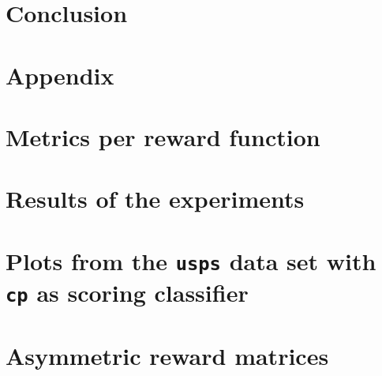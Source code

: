 \documentclass[twoside,11pt]{article}
\begin{document}
\section{Conclusion}

\newpage

\renewcommand{\appendixpagename}{}
\begin{appendices}
  \section*{Appendix}

  \section{Metrics per reward function}
  \label{sec:metrics_rew}

  

  \newpage

  \section{Results of the experiments}
  \label{sec:res}

  

  \newpage

  \section{Plots from the \texttt{usps} data set with
    \texttt{cp} as scoring classifier}
  \label{sec:plots}

  

  \newpage

  \section{Asymmetric reward matrices}
  \label{sec:asym_rew_mat}

  \setcounter{MaxMatrixCols}{11}


\end{appendices}
\end{document}
